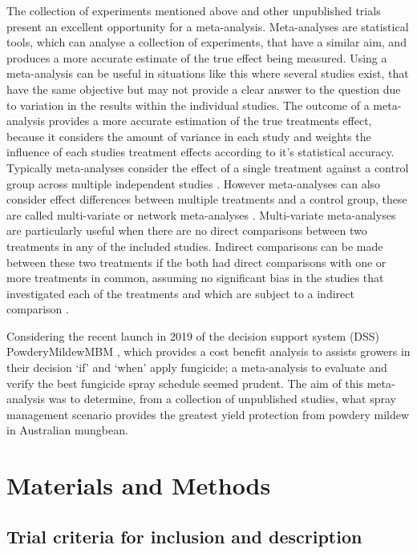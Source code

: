 \documentclass[agronomy,article,submit,moreauthors,pdftex]{mdpi}
\begin{document}
The collection of experiments mentioned above and other unpublished trials present an excellent opportunity for a meta-analysis.
Meta-analyses are statistical tools, which can analyse a collection of experiments, that have a similar aim, and produces a more accurate estimate of the true effect being measured.
Using a meta-analysis can be useful in situations like this where several studies exist, that have the same objective but may not provide a clear answer to the question due to variation in the results within the individual studies.
The outcome of a meta-analysis provides a more accurate estimation of the true treatments effect, because it considers the amount of variance in each study and weights the influence of each studies treatment effects according to it's statistical accuracy.
Typically meta-analyses consider the effect of a single treatment against a control group across multiple independent studies \citep{Madden2011}.
However meta-analyses can also consider effect differences between multiple treatments and a control group, these are called multi-variate or network meta-analyses \citep{MaddenEtAl2016}.
Multi-variate meta-analyses are particularly useful when there are no direct comparisons between two treatments in any of the included studies.
Indirect comparisons can be made between these two treatments if the both had direct comparisons with one or more treatments in common, assuming no significant bias in the studies that investigated each of the treatments and which are subject to a indirect comparison \citep{Jansen2011}.

Considering the recent launch in 2019 of the decision support system (DSS) PowderyMildewMBM \citep{Diggle}, which provides a cost benefit analysis to assists growers in their decision `if' and `when' apply fungicide; a meta-analysis to evaluate and verify the best fungicide spray schedule seemed prudent.
The aim of this meta-analysis was to determine, from a collection of unpublished studies, what spray management scenario provides the greatest yield protection from powdery mildew in Australian mungbean.

\hypertarget{materials-and-methods}{%
\section{Materials and Methods}\label{materials-and-methods}}

\hypertarget{trial-criteria-for-inclusion-and-description}{%
\subsection{Trial criteria for inclusion and description}\label{trial-criteria-for-inclusion-and-description}}
\end{document}
